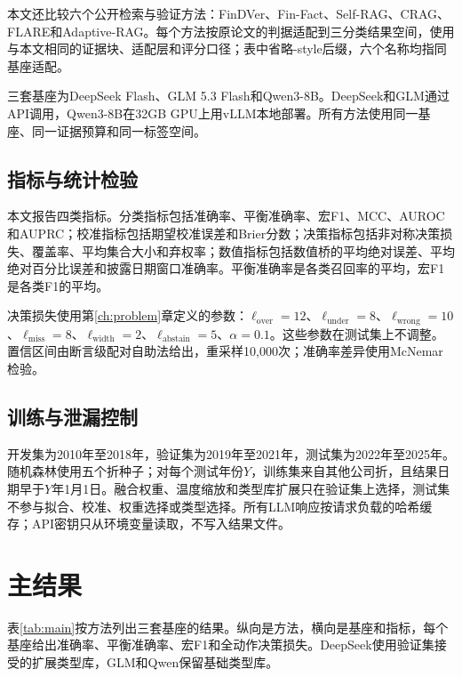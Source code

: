 {\sloppy 本文还比较六个公开检索与验证方法：FinDVer\citep{zhao2024findver}、Fin-Fact\citep{rangapur2025finfact}、Self-RAG\citep{asai2024selfrag}、CRAG\citep{yan2024crag}、FLARE\citep{jiang2023flare}和Adaptive-RAG\citep{jeong2024adaptiverag}。每个方法按原论文的判据适配到三分类结果空间，使用与本文相同的证据块、适配层和评分口径；表中省略-style后缀，六个名称均指同基座适配。\par}

三套基座为DeepSeek Flash、GLM 5.3 Flash和Qwen3-8B\citep{qwen2025qwen3}。DeepSeek和GLM通过API调用，Qwen3-8B在32GB GPU上用vLLM本地部署。所有方法使用同一基座、同一证据预算和同一标签空间。

\subsection{指标与统计检验}

本文报告四类指标。分类指标包括准确率、平衡准确率、宏F1、MCC、AUROC和AUPRC；校准指标包括期望校准误差和Brier分数；决策指标包括非对称决策损失、覆盖率、平均集合大小和弃权率；数值指标包括数值桥的平均绝对误差、平均绝对百分比误差和披露日期窗口准确率。平衡准确率是各类召回率的平均\citep{brodersen2010balanced}，宏F1是各类F1的平均\citep{sokolova2009performance}。

决策损失使用第\ref{ch:problem}章定义的参数：$\ell_{\text{over}}=12$、$\ell_{\text{under}}=8$、$\ell_{\text{wrong}}=10$、$\ell_{\text{miss}}=8$、$\ell_{\text{width}}=2$、$\ell_{\text{abstain}}=5$、$\alpha=0.1$。这些参数在测试集上不调整。置信区间由断言级配对自助法给出，重采样10,000次；准确率差异使用McNemar检验。

\subsection{训练与泄漏控制}

开发集为2010年至2018年，验证集为2019年至2021年，测试集为2022年至2025年。随机森林使用五个折种子；对每个测试年份$Y$，训练集来自其他公司折，且结果日期早于$Y$年1月1日。融合权重、温度缩放和类型库扩展只在验证集上选择，测试集不参与拟合、校准、权重选择或类型选择。所有LLM响应按请求负载的哈希缓存；API密钥只从环境变量读取，不写入结果文件。

\section{主结果}

表\ref{tab:main}按方法列出三套基座的结果。纵向是方法，横向是基座和指标，每个基座给出准确率、平衡准确率、宏F1和全动作决策损失。DeepSeek使用验证集接受的扩展类型库，GLM和Qwen保留基础类型库。


